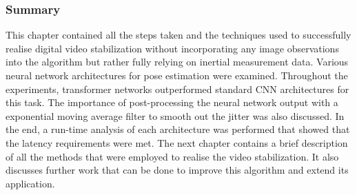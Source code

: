 \subsubsection{Summary}
This chapter contained all the steps taken and the techniques used to successfully realise digital video stabilization without incorporating any image observations into the algorithm but rather fully relying on inertial measurement data. Various neural network architectures for pose estimation were examined. Throughout the experiments, transformer networks outperformed standard CNN architectures for this task. The importance of post-processing the neural network output with a exponential moving average filter to smooth out the jitter was also discussed. In the end, a run-time analysis of each architecture was performed that showed that the latency requirements were met. The next chapter contains a brief description of all the methods that were employed to realise the video stabilization. It also discusses further work that can be done to improve this algorithm and extend its application.


